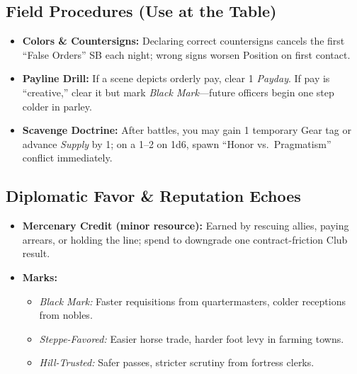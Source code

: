 \subsection*{Field Procedures (Use at the Table)}
\begin{itemize}
  \item \textbf{Colors \& Countersigns:} Declaring correct countersigns cancels the first “False Orders” SB each night; wrong signs worsen Position on first contact.
  \item \textbf{Payline Drill:} If a scene depicts orderly pay, clear 1 \emph{Payday}. If pay is “creative,” clear it but mark \emph{Black Mark}—future officers begin one step colder in parley.
  \item \textbf{Scavenge Doctrine:} After battles, you may gain 1 temporary Gear tag or advance \emph{Supply} by 1; on a 1–2 on 1d6, spawn “Honor vs.\ Pragmatism” conflict immediately.
\end{itemize}

\subsection*{Diplomatic Favor \& Reputation Echoes}
\begin{itemize}
  \item \textbf{Mercenary Credit (minor resource):} Earned by rescuing allies, paying arrears, or holding the line; spend to downgrade one contract-friction Club result.
  \item \textbf{Marks:}
    \begin{itemize}
      \item \emph{Black Mark:} Faster requisitions from quartermasters, colder receptions from nobles.
      \item \emph{Steppe-Favored:} Easier horse trade, harder foot levy in farming towns.
      \item \emph{Hill-Trusted:} Safer passes, stricter scrutiny from fortress clerks.
    \end{itemize}
\end{itemize}